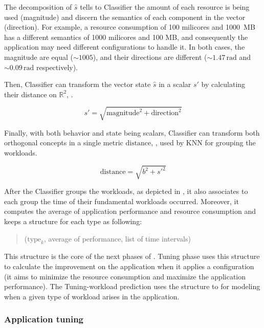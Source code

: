 The decomposition of $\hat{s}$ tells to Classifier the amount of each resource
is being used (magnitude) and discern the semantics of each component in the
vector (direction). For example, a resource consumption of 100 milicores and
1000 MB has a different semantics of 1000 milicores and 100 MB, and consequently
the application may need different configurations to handle it. In both cases,
the magnitude are equal ($\sim 1005$), and their directions are different ($\sim
1.47\,\text{rad}$ and $\sim 0.09\,\text{rad}$ respectively).

Then, Classifier can transform the vector state $\hat{s}$ in a scalar $s'$ by
calculating their distance on $\mathbb{R}^2$, .

\begin{equation}
  s' = \sqrt{\text{magnitude}^2 + \text{direction}^2}
  \label{eq:distance1}
\end{equation}

Finally, with both behavior and state being scalars, Classifier can transform
both orthogonal concepts in a single metric $\text{distance}$,
, used by KNN for grouping the workloads.

\begin{equation}
  \text{distance} = \sqrt{b^2 + s'^2}
  \label{eq:distance2}
\end{equation}

After the Classifier groups the workloads, as depicted in
, it also associates to each group the time of
their fundamental workloads occurred. Moreover, it computes the average of application
performance and resource consumption and keeps a structure for each type as following:

\begin{quote}
  \centering
  ($\text{type}_k$, average of performance, list of time intervals)
\end{quote}

This structure is the core of the next phases of \name. Tuning phase uses this
structure to calculate the improvement on the application when it applies a
configuration (it aims to minimize the resource consumption and maximize the
application performance). The Tuning-workload prediction uses the structure to
for modeling when a given type of workload arises in the application.

\subsubsection{Application tuning}


